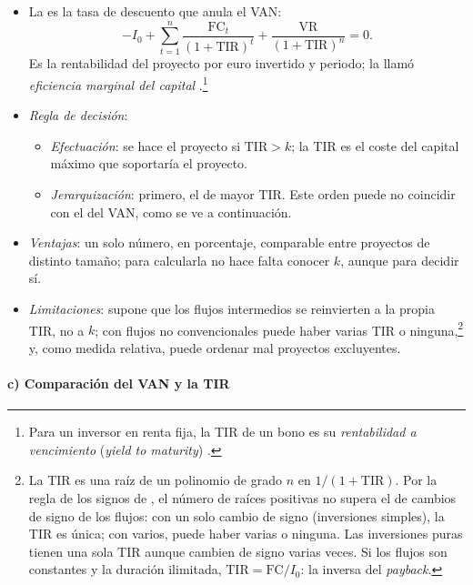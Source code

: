 \documentclass[11pt]{article}
\begin{document}
\begin{itemize}
\item La  es la tasa de descuento que anula el VAN:
  \[
  -I_0+\sum_{t=1}^{n}\frac{\mathrm{FC}_t}{(1+\mathrm{TIR})^t}+\frac{\mathrm{VR}}{(1+\mathrm{TIR})^n}=0.
  \]
  Es la rentabilidad del proyecto por euro invertido y periodo; \textcite{Keynes1936} la llamó \emph{eficiencia marginal del capital} .\footnote{Para un inversor en renta fija, la TIR de un bono es su \emph{rentabilidad a vencimiento} (\emph{yield to maturity}) .}
\item \emph{Regla de decisión}:
  \begin{itemize}
  \item \emph{Efectuación}: se hace el proyecto si $\mathrm{TIR}>k$; la TIR es el coste del capital máximo que soportaría el proyecto.
  \item \emph{Jerarquización}: primero, el de mayor TIR. Este orden puede no coincidir con el del VAN, como se ve a continuación.
  \end{itemize}
\item \emph{Ventajas}: un solo número, en porcentaje, comparable entre proyectos de distinto tamaño; para calcularla no hace falta conocer $k$, aunque para decidir sí.
\item \emph{Limitaciones}: supone que los flujos intermedios se reinvierten a la propia TIR, no a $k$; con flujos no convencionales puede haber varias TIR o ninguna,\footnote{La TIR es una raíz de un polinomio de grado $n$ en $1/(1+\mathrm{TIR})$. Por la regla de los signos de , el número de raíces positivas no supera el de cambios de signo de los flujos: con un solo cambio de signo (inversiones simples), la TIR es única; con varios, puede haber varias o ninguna. Las inversiones puras tienen una sola TIR aunque cambien de signo varias veces\nocite{TeichroewRobichekMontalbano1965Analysis}. Si los flujos son constantes y la duración ilimitada, $\mathrm{TIR}=\mathrm{FC}/I_0$: la inversa del \emph{payback}.} y, como medida relativa, puede ordenar mal proyectos excluyentes.
\end{itemize}

\paragraph{c) Comparación del VAN y la TIR}
\end{document}
